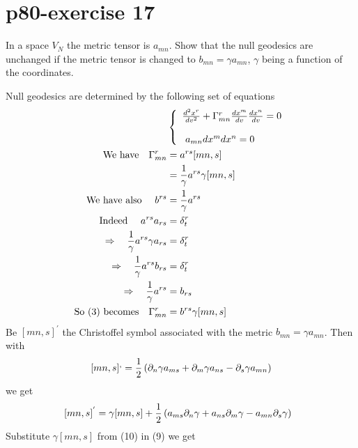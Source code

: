 \section{p80-exercise 17}
\begin{tcolorbox}
In a space $V_N$ the metric tensor is $a_{mn}$. Show that the null geodesics are unchanged if the metric tensor is changed to $b_{mn} = \gamma a_{mn} $, $\gamma$ being a function of the coordinates.
\end{tcolorbox}
Null geodesics are determined by the following set of equations
\begin{align}
\ & \left \{  \begin {array}{l}
\dv[2]{x^r}{v} + \Gamma^r_{mn}\dv{x^m}{v}\dv{x^n}{v} = 0\\\\
\ a_{mn}dx^mdx^n =0
\end{array}\right.\\
\text{We have}\quad  \Gamma^r_{mn} & = a^{rs}[mn,s]\\
\ & = \frac{1}{\gamma}a^{rs}\gamma[mn,s]\\
\text{We have also }\quad  b^{rs} & = \frac{1}{\gamma}a^{rs}\\
\text{Indeed }\quad  a^{rs}a_{rs}&= \delta^r_t\\
\Rightarrow\quad  \frac{1}{\gamma}a^{rs}\gamma a_{rs}&= \delta^r_t\\
\Rightarrow\quad  \frac{1}{\gamma}a^{rs}b_{rs}&= \delta^r_t\\
\Rightarrow\quad  \frac{1}{\gamma}a^{rs} &= b_{rs}\\
\text{So (3) becomes}\quad  \Gamma^r_{mn} & =b^{rs}\gamma[mn,s]
\end{align}
Be $ [mn,s]^{'} $ the Christoffel symbol associated with the metric $b_{mn}= \gamma a_{mn}$. Then with  $$[mn,s]^, = \frac{1}{2} \left(\partial_n \gamma a_{ms}+\partial_m \gamma a_{ns}-\partial_s \gamma a_{mn} \right)$$ we get
\begin{align}
\ [mn,s]^{'} &= \gamma [mn,s] + \frac{1}{2}\left( a_{ms}\partial_n \gamma+a_{ns}\partial_m \gamma-a_{mn}\partial_s \gamma \right)
\end{align}
Substitute $\gamma [mn,s]$ from (10) in (9) we get
